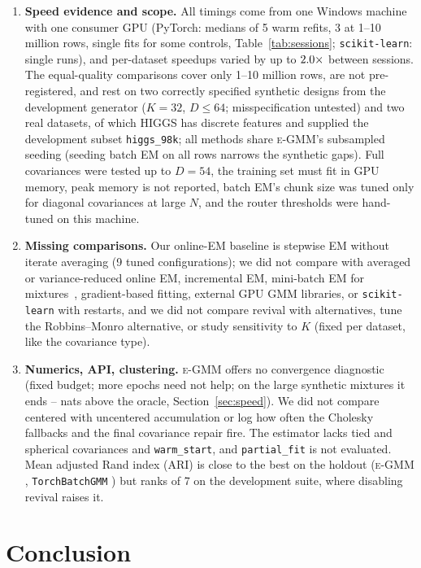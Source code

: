 \documentclass[10pt]{article} %
\newcommand{\egmm}{\textsc{e-GMM}}
\begin{document}
\begin{enumerate}[leftmargin=*,nosep]
  \item \textbf{Speed evidence and scope.} All timings come from one Windows machine with one consumer GPU (PyTorch: medians of 5 warm refits, 3 at 1--10 million rows, single fits for some controls, Table~\ref{tab:sessions}; \texttt{scikit-learn}: single runs), and per-dataset speedups varied by up to $2.0\times$ between sessions. The equal-quality comparisons cover only 1--10 million rows, are not pre-registered, and rest on two correctly specified synthetic designs from the development generator ($K = 32$, $D \le 64$; misspecification untested) and two real datasets, of which HIGGS has discrete features and supplied the development subset \texttt{higgs\_98k}; all methods share \egmm{}'s subsampled seeding (seeding batch EM on all rows narrows the synthetic gaps). Full covariances were tested up to $D = 54$, the training set must fit in GPU memory, peak memory is not reported, batch EM's chunk size was tuned only for diagonal covariances at large $N$, and the router thresholds were hand-tuned on this machine.
  \item \textbf{Missing comparisons.} Our online-EM baseline is stepwise EM without iterate averaging (9 tuned configurations); we did not compare with averaged or variance-reduced online EM, incremental EM, mini-batch EM for mixtures~\citep{nguyen2020minibatch}, gradient-based fitting, external GPU GMM libraries, or \texttt{scikit-learn} with restarts, and we did not compare revival with alternatives, tune the Robbins--Monro alternative, or study sensitivity to $K$ (fixed per dataset, like the covariance type).
  \item \textbf{Numerics, API, clustering.} \egmm{} offers no convergence diagnostic (fixed budget; more epochs need not help; on the large synthetic mixtures it ends \rSOrcFullEMin--\rSOrcFullEMax{} nats above the oracle, Section~\ref{sec:speed}). We did not compare centered with uncentered accumulation or log how often the Cholesky fallbacks and the final covariance repair fire. The estimator lacks tied and spherical covariances and \texttt{warm\_start}, and \texttt{partial\_fit} is not evaluated. Mean adjusted Rand index (ARI) is close to the best on the holdout (\egmm{} \rHARIEGMM, \texttt{TorchBatchGMM} \rHARITB) but ranks \rARIRankEGMM{} of 7 on the development suite, where disabling revival raises it.
\end{enumerate}

\section{Conclusion}
\label{sec:conclusion}
\end{document}
